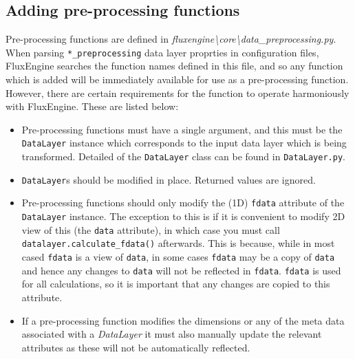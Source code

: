 \documentclass[]{scrartcl}
\begin{document}
\subsection{Adding pre-processing functions}
Pre-processing functions are defined in \textit{fluxengine{\textbackslash}core{\textbackslash}data\_preprocessing.py}. When parsing \texttt{*\_preprocessing} data layer proprties in configuration files, FluxEngine searches the function names defined in this file, and so any function which is added will be immediately available for use as a pre-processing function. However, there are certain requirements for the function to operate harmoniously with FluxEngine. These are listed below:
\begin{itemize}
	\item Pre-processing functions must have a single argument, and this must be the \texttt{DataLayer} instance which corresponds to the input data layer which is being transformed. Detailed of the \texttt{DataLayer} class can be found in \texttt{DataLayer.py}.
	\item \texttt{DataLayer}s should be modified in place. Returned values are ignored.
	\item Pre-processing functions should only modify the (1D) \texttt{fdata} attribute of the \texttt{DataLayer} instance. The exception to this is if it is convenient to modify 2D view of this (the \texttt{data} attribute), in which case you must call \texttt{datalayer.calculate\_fdata()} afterwards. This is because, while in most cased \texttt{fdata} is a view of \texttt{data}, in some cases \texttt{fdata} may be a copy of \texttt{data} and hence any changes to \texttt{data} will not be reflected in \texttt{fdata}. \texttt{fdata} is used for all calculations, so it is important that any changes are copied to this attribute.
	\item If a pre-processing function modifies the dimensions or any of the meta data associated with a \textit{DataLayer} it must also manually update the relevant attributes as these will not be automatically reflected.
\end{itemize}
\end{document}
